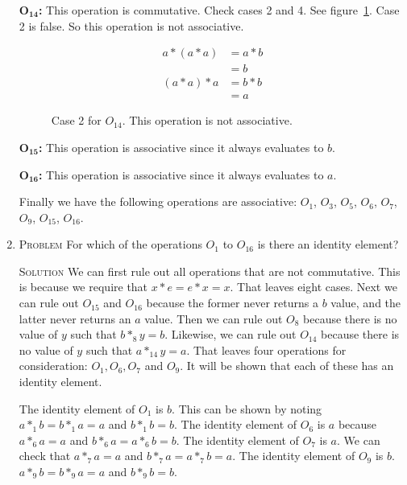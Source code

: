 \documentclass[draft,twoside]{amsart}
\newcommand{\Solution}{\textsc{Solution}\xspace}
\newcommand{\Problem}{\textsc{Problem}\xspace}
\begin{document}
\begin{enumerate}
   $\mathbf{O_{14}}$\textbf{:} This operation is commutative. Check cases
   2 and 4. See figure~\ref{fig:o14_assoc}. Case 2 is false. So this
   operation is not associative.

   \begin{figure}
      \caption{Case 2 for $O_{14}$. This operation is not associative.}
      \label{fig:o14_assoc}
      \begin{align*}
         a * (a * a) & = a * b \\
	             & = b \\
         (a * a) * a & = b * b \\
	             & = a
      \end{align*}
   \end{figure}

   $\mathbf{O_{15}}$\textbf{:} This operation is associative since it
   always evaluates to $b$.

   $\mathbf{O_{16}}$\textbf{:} This operation is associative since
   it always evaluates to $a$.

   Finally we have the following operations are associative: $O_1$, 
   $O_3$, $O_5$, $O_6$, $O_7$, $O_9$, $O_15$, $O_16$.

   \item \Problem For which of the operations $O_1$ to $O_{16}$ is there an 
   identity element?

   \noindent \Solution We can first rule out all operations that are not
   commutative. This is because we require that $x*e=e*x=x$. That leaves
   eight cases. Next we can rule out $O_{15}$ and $O_{16}$ because the
   former never returns a $b$ value, and the latter never returns an $a$
   value. Then we can rule out $O_8$ because there is no value of $y$ such
   that $b *_8 y = b$. Likewise, we can rule out $O_{14}$ because there
   is no value of $y$ such that $a *_{14} y = a$. That leaves four operations
   for consideration: $O_1, O_6, O_7$ and $O_9$. It will be shown
   that each of these has an identity element.

   The identity element of $O_1$ is $b$. This can be shown by noting
   $a *_{1} b = b *_{1} a = a$ and $b *_1 b = b$. The identity element
   of $O_6$ is $a$ because $a *_6 a = a$ and $b *_6 a = a *_6 b = b$.
   The identity element of $O_7$ is $a$. We can check that $a *_7 a = a$ and
   $b *_7 a = a *_7 b = a$. The identity element of $O_9$ is $b$.
   $a *_9 b = b *_9 a = a$ and $b *_9 b = b$.


\end{enumerate}
\end{document}
